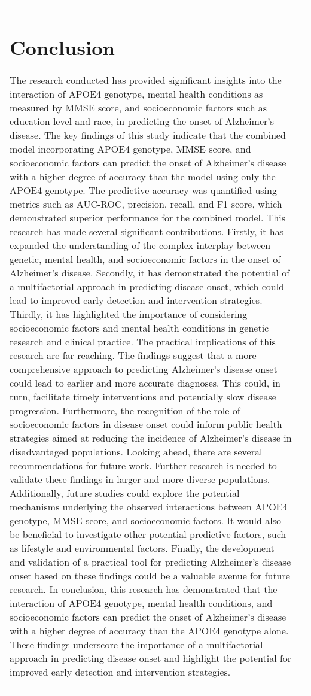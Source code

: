 \documentclass[conference]{IEEEtran}
\begin{document}
\begin{table}[htbp]
\begin{tabular}{|l|c|}
\section{Conclusion}
The research conducted has provided significant insights into the interaction of APOE4 genotype, mental health conditions as measured by MMSE score, and socioeconomic factors such as education level and race, in predicting the onset of Alzheimer's disease. The key findings of this study indicate that the combined model incorporating APOE4 genotype, MMSE score, and socioeconomic factors can predict the onset of Alzheimer's disease with a higher degree of accuracy than the model using only the APOE4 genotype. The predictive accuracy was quantified using metrics such as AUC-ROC, precision, recall, and F1 score, which demonstrated superior performance for the combined model. This research has made several significant contributions. Firstly, it has expanded the understanding of the complex interplay between genetic, mental health, and socioeconomic factors in the onset of Alzheimer's disease. Secondly, it has demonstrated the potential of a multifactorial approach in predicting disease onset, which could lead to improved early detection and intervention strategies. Thirdly, it has highlighted the importance of considering socioeconomic factors and mental health conditions in genetic research and clinical practice. The practical implications of this research are far-reaching. The findings suggest that a more comprehensive approach to predicting Alzheimer's disease onset could lead to earlier and more accurate diagnoses. This could, in turn, facilitate timely interventions and potentially slow disease progression. Furthermore, the recognition of the role of socioeconomic factors in disease onset could inform public health strategies aimed at reducing the incidence of Alzheimer's disease in disadvantaged populations. Looking ahead, there are several recommendations for future work. Further research is needed to validate these findings in larger and more diverse populations. Additionally, future studies could explore the potential mechanisms underlying the observed interactions between APOE4 genotype, MMSE score, and socioeconomic factors. It would also be beneficial to investigate other potential predictive factors, such as lifestyle and environmental factors. Finally, the development and validation of a practical tool for predicting Alzheimer's disease onset based on these findings could be a valuable avenue for future research. In conclusion, this research has demonstrated that the interaction of APOE4 genotype, mental health conditions, and socioeconomic factors can predict the onset of Alzheimer's disease with a higher degree of accuracy than the APOE4 genotype alone. These findings underscore the importance of a multifactorial approach in predicting disease onset and highlight the potential for improved early detection and intervention strategies.


\end{tabular}
\end{table}
\end{document}
